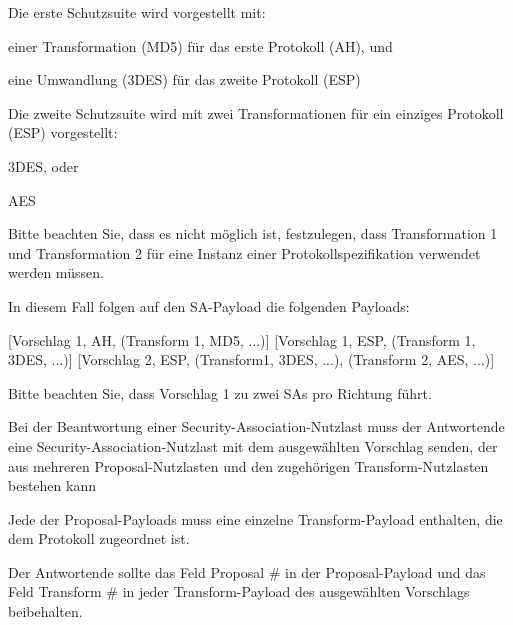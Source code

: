\documentclass[a4paper]{article}
\begin{document}
\begin{multicols}{3}
\begin{itemize*}
\begin{itemize*}
                  \begin{itemize*}
                        \item Die erste Schutzsuite wird vorgestellt mit:
                        \begin{itemize*} \item einer Transformation (MD5) für das erste Protokoll (AH), und \item eine Umwandlung (3DES) für das zweite Protokoll (ESP) \end{itemize*}
                        \item Die zweite Schutzsuite wird mit zwei Transformationen für ein einziges Protokoll (ESP) vorgestellt:
                        \begin{itemize*} \item 3DES, oder \item AES \end{itemize*}
                        \item Bitte beachten Sie, dass es nicht möglich ist, festzulegen, dass Transformation 1 und Transformation 2 für eine Instanz einer Protokollspezifikation verwendet werden müssen.
                        \item In diesem Fall folgen auf den SA-Payload die folgenden Payloads:
                        \begin{itemize*} \item {[}Vorschlag 1, AH, (Transform 1, MD5, ...){]} {[}Vorschlag 1, ESP, (Transform 1, 3DES, ...){]} {[}Vorschlag 2, ESP, (Transform1, 3DES, ...), (Transform 2, AES, ...){]} \end{itemize*}
                        \item Bitte beachten Sie, dass Vorschlag 1 zu zwei SAs pro Richtung führt.
                  \end{itemize*}
                  \item
                  Bei der Beantwortung einer Security-Association-Nutzlast muss der
                  Antwortende eine Security-Association-Nutzlast mit dem ausgewählten
                  Vorschlag senden, der aus mehreren Proposal-Nutzlasten und den
                  zugehörigen Transform-Nutzlasten bestehen kann
                  \item
                  Jede der Proposal-Payloads muss eine einzelne Transform-Payload
                  enthalten, die dem Protokoll zugeordnet ist.
                  \item
                  Der Antwortende sollte das Feld Proposal \# in der Proposal-Payload
                  und das Feld Transform \# in jeder Transform-Payload des ausgewählten
                  Vorschlags beibehalten.


\end{itemize*}
\end{itemize*}
\end{multicols}
\end{document}

